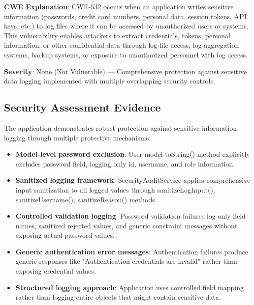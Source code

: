 \documentclass[]{UCD_CS_FYP_Report}
\begin{document}
\textbf{CWE Explanation}: CWE-532 occurs when an application writes sensitive information (passwords, credit card numbers, personal data, session tokens, API keys, etc.) to log files where it can be accessed by unauthorized users or systems. This vulnerability enables attackers to extract credentials, tokens, personal information, or other confidential data through log file access, log aggregation systems, backup systems, or exposure to unauthorized personnel with log access.

\textbf{Severity}: None (Not Vulnerable) — Comprehensive protection against sensitive data logging implemented with multiple overlapping security controls.

\subsection{Security Assessment Evidence}
The application demonstrates robust protection against sensitive information logging through multiple protective mechanisms:
\begin{itemize}
	\item \textbf{Model-level password exclusion}: User model toString() method explicitly excludes password field, logging only id, username, and role information.
	\item \textbf{Sanitized logging framework}: SecurityAuditService applies comprehensive input sanitization to all logged values through sanitizeLogInput(), sanitizeUsername(), sanitizeReason() methods.
	\item \textbf{Controlled validation logging}: Password validation failures log only field names, sanitized rejected values, and generic constraint messages without exposing actual password values.
	\item \textbf{Generic authentication error messages}: Authentication failures produce generic responses like "Authentication credentials are invalid" rather than exposing credential values.
	\item \textbf{Structured logging approach}: Application uses controlled field mapping rather than logging entire objects that might contain sensitive data.
\end{itemize}
\end{document}
